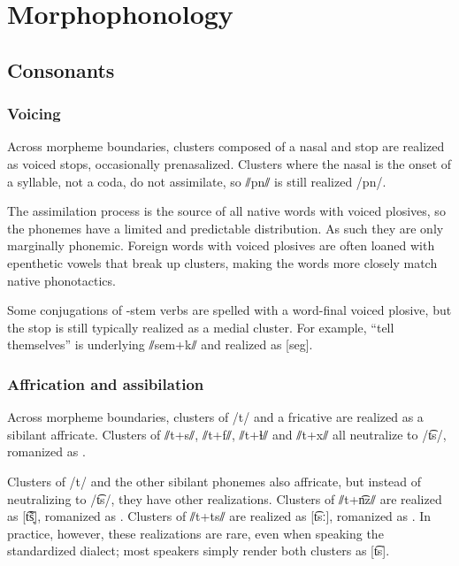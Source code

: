 \setchapterpreamble[u]{\margintoc}
\chapter{Morphophonology}
\section{Consonants} \label{sec:conso_morphono}
\subsection{Voicing}
Across morpheme boundaries, clusters composed of a nasal and stop are realized as voiced stops, occasionally prenasalized.  Clusters where the nasal is the onset of a syllable, not a coda, do not assimilate, so ⫽pn⫽ is still realized /pn/. 

The assimilation process is the source of all native words with voiced plosives, so the phonemes have a limited and predictable distribution. As such they are only marginally phonemic. Foreign words with voiced plosives are often loaned with epenthetic vowels that break up clusters, making the words more closely match native phonotactics. %

Some conjugations of -stem verbs are spelled with a word-final voiced plosive, but the stop is still typically realized as a medial cluster. For example,  “tell themselves” is underlying ⫽sem+k⫽ and realized as [seg]. 

\subsection{Affrication and assibilation}
Across morpheme boundaries, clusters of /t/ and a fricative are realized as a sibilant affricate. Clusters of ⫽t+s⫽, ⫽t+f⫽, ⫽t+ɬ⫽ and ⫽t+x⫽ all neutralize to /t͡s/, romanized as . 

Clusters of /t/ and the other sibilant phonemes also affricate, but instead of neutralizing to /t͡s/, they have other realizations. Clusters of ⫽t+n͡z⫽ are realized as [t͡s̞̃], romanized as .  Clusters of ⫽t+ts⫽ are realized as [t͡sː], romanized as . In practice, however, these realizations are rare, even when speaking the standardized dialect; most speakers simply render both clusters as [t͡s].

